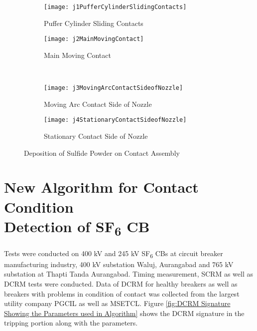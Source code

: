 \begin{figure}
    \centering
    \begin{subfigure}[b]{0.49\textwidth}
        \centering
        \texttt{[image: j1PufferCylinderSlidingContacts]}
        \caption{Puffer Cylinder Sliding Contacts}
        \label{fig:Puffer Cylinder Sliding Contacts}
    \end{subfigure}
    \begin{subfigure}[b]{0.49\textwidth}
        \centering
        \texttt{[image: j2MainMovingContact]}
        \caption{Main Moving Contact}
        \label{fig:Main Moving Contact}
    \end{subfigure}
    \\
    \begin{subfigure}[b]{0.49\textwidth}
        \centering
        \texttt{[image: j3MovingArcContactSideofNozzle]}
        \caption{Moving Arc Contact Side of Nozzle}
        \label{fig:Moving Arc Contact Side of Nozzle}
    \end{subfigure}
    \begin{subfigure}[b]{0.49\textwidth}
        \centering
        \texttt{[image: j4StationaryContactSideofNozzle]}
        \caption{Stationary Contact Side of Nozzle}
        \label{fig:Stationary Contact Side of Nozzle}
    \end{subfigure}
    
    \caption{Deposition of Sulfide Powder on Contact Assembly}
    \label{fig:Deposition of Sulfide Powder on Contact Assembly}
\end{figure}

\clearpage
\section[New Algorithm for Contact Condition Detection of SF\textsubscript{6} CB]{New Algorithm for Contact Condition \\Detection of SF\textsubscript{6} CB}

Tests were conducted on 400 kV and 245 kV SF\textsubscript{6} CBs at circuit breaker manufacturing industry, 400 kV substation Waluj, Aurangabad and 765 kV substation at Thapti Tanda Aurangabad. Timing measurement, SCRM as well as DCRM tests were conducted. Data of DCRM for healthy breakers as well as breakers with problems in condition of contact was collected from the largest utility company PGCIL as well as MSETCL. Figure \ref{fig:DCRM Signature Showing the Parameters used in Algorithm} shows the DCRM signature in the tripping portion along with the parameters.

